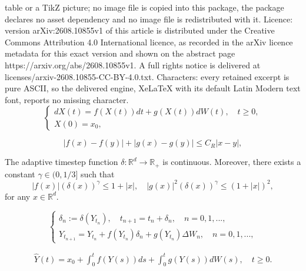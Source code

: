 \documentclass[10pt,a4paper]{amsart}
\begin{document}
table or a TikZ picture; no image file is copied into this package, the package declares no asset dependency and no image file is redistributed with it. Licence: version arXiv:2608.10855v1 of this article is distributed under the Creative Commons Attribution 4.0 International licence, as recorded in the arXiv licence metadata for this exact version and shown on the abstract page https://arxiv.org/abs/2608.10855v1. A full rights notice is delivered at licenses/arxiv-2608.10855-CC-BY-4.0.txt. Characters: every retained excerpt is pure ASCII, so the delivered engine, XeLaTeX with its default Latin Modern text font, reports no missing character.
\begin{equation}  \label{equation}
	\left\{  
	\begin{array}{l}
		dX(t) = f(X(t))dt + g(X(t))dW(t), \quad t \ge 0,  \\
		X(0) = x_0,
	\end{array}
	\right.
\end{equation}

	\begin{equation} \label{llc}
		\left| {f(x) - f(y)} \right| + \left| {g(x) - g(y)} \right| \le {C_R}\left| {x - y} \right|,
	\end{equation}

\begin{assumption}  \label{A-stepsize}
	The adaptive timestep function $\delta :{\mathbb{R}^d} \to \mathbb{R}_+$ is continuous. Moreover, there exists a constant $\gamma \in (0,1/3]$ such that 
	\begin{equation}  \label{A-step1}
		\left| {f(x)} \right|{\left( {\delta (x)} \right)^\gamma } \le {1 + \left| x \right|} , \quad {\left| {g(x)} \right|^2}{\left( {\delta (x)} \right)^\gamma } \le  {\left( {1 + \left| x \right|} \right)^2} ,
	\end{equation}	
	for any $x \in \mathbb{R}^d$.
\end{assumption}

\begin{equation}  \label{scheme}
	\left\{  
	\begin{array}{l}
	    \delta _n := \delta (Y_{t_n}), \quad t_{n+1} = t_n + \delta _n , \quad n = 0,1,...,\\
		{Y_{{t_{n + 1}}}} =  {{Y_{{t_n}}} + f({Y_{{t_n}}}){\delta _n} + g({Y_{{t_n}}})\Delta {W_n}}, \quad n = 0,1,...,
	\end{array}
	\right.
\end{equation}

\begin{equation}  \label{continuous2}
\begin{split}
	\hat{Y}(t) = {x_0} + \int_0^t {f( Y(s))ds}  + \int_0^t {g(Y(s))dW(s)},  \quad   t \ge 0.
\end{split}
\end{equation}
\end{document}
